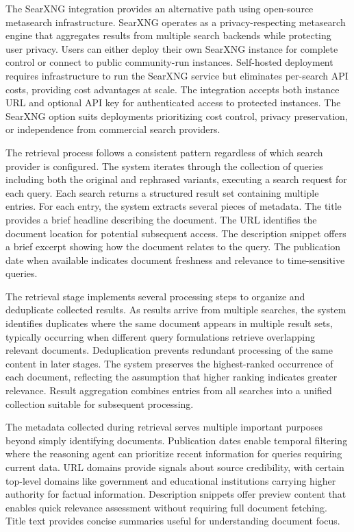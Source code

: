 The SearXNG integration provides an alternative path using open-source metasearch infrastructure. SearXNG operates as a privacy-respecting metasearch engine that aggregates results from multiple search backends while protecting user privacy. Users can either deploy their own SearXNG instance for complete control or connect to public community-run instances. Self-hosted deployment requires infrastructure to run the SearXNG service but eliminates per-search API costs, providing cost advantages at scale. The integration accepts both instance URL and optional API key for authenticated access to protected instances. The SearXNG option suits deployments prioritizing cost control, privacy preservation, or independence from commercial search providers.

The retrieval process follows a consistent pattern regardless of which search provider is configured. The system iterates through the collection of queries including both the original and rephrased variants, executing a search request for each query. Each search returns a structured result set containing multiple entries. For each entry, the system extracts several pieces of metadata. The title provides a brief headline describing the document. The URL identifies the document location for potential subsequent access. The description snippet offers a brief excerpt showing how the document relates to the query. The publication date when available indicates document freshness and relevance to time-sensitive queries.

The retrieval stage implements several processing steps to organize and deduplicate collected results. As results arrive from multiple searches, the system identifies duplicates where the same document appears in multiple result sets, typically occurring when different query formulations retrieve overlapping relevant documents. Deduplication prevents redundant processing of the same content in later stages. The system preserves the highest-ranked occurrence of each document, reflecting the assumption that higher ranking indicates greater relevance. Result aggregation combines entries from all searches into a unified collection suitable for subsequent processing.

The metadata collected during retrieval serves multiple important purposes beyond simply identifying documents. Publication dates enable temporal filtering where the reasoning agent can prioritize recent information for queries requiring current data. URL domains provide signals about source credibility, with certain top-level domains like government and educational institutions carrying higher authority for factual information. Description snippets offer preview content that enables quick relevance assessment without requiring full document fetching. Title text provides concise summaries useful for understanding document focus.

